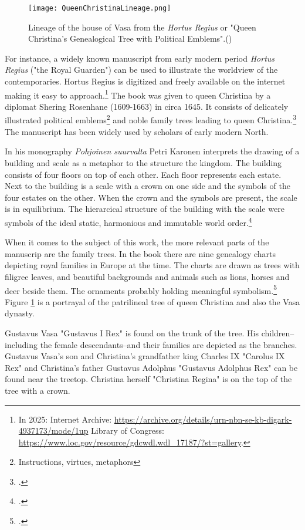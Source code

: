 \begin{figure}
	\texttt{[image: QueenChristinaLineage.png]}
	\caption{Lineage of the house of Vasa from the \textit{Hortus Regius} or "Queen Christina's Genealogical Tree with Political Emblems".(\cite{hortusregius})} 
	\centering
	\label{queenlineage}
\end{figure}

For instance, a widely known manuscript from early modern period \textit{Hortus Regius} ("the Royal Guarden") can be used to illustrate the worldview of the contemporaries. Hortus Regius is digitized and freely available on the internet making it easy to approach.\footnote{In 2025: Internet Archive: \url{https://archive.org/details/urn-nbn-se-kb-digark-4937173/mode/1up} Library of Congress: \url{https://www.loc.gov/resource/gdcwdl.wdl\_17187/?st=gallery}.} The book was given to queen Christina by a diplomat Shering Rosenhane (1609-1663) in circa 1645. It consists of delicately illustrated political emblems\footnote{Instructions, virtues, metaphors} and noble family trees leading to queen Christina.\footcites{congresslibrary}[p. 271.]{BlennowAnna} The manuscript has been widely used by scholars of early modern North.

In his monography \textit{Pohjoinen suurvalta} Petri Karonen interprets the drawing of a building and scale as a metaphor to the structure the kingdom. The building consists of four floors on top of each other. Each floor represents each estate. Next to the building is a scale with a crown on one side and the symbols of the four estates on the other. When the crown and the symbols are present, the scale is in equilibrium. The hierarcical structure of the building with the scale were symbols of the ideal static, harmonious and immutable world order.\footcite[p. 162-165.]{pSuurvalta}

When it comes to the subject of this work, the more relevant parts of the manuscrip are the family trees. In the book there are nine genealogy charts depicting royal families in Europe at the time. The charts are drawn as trees with filigree leaves, and beautiful backgrounds and animals such as lions, horses and deer beside them. The ornaments probably holding meaningful symbolism.\footcite{hortusregius} Figure \ref{queenlineage} is a portrayal of the patrilineal tree of queen Christina and also the Vasa dynasty.

Gustavus Vasa "Gustavus I Rex" is found on the trunk of the tree. His children–including the female descendants–and their families are depicted as the branches. Gustavus Vasa's son and Christina's grandfather king Charles IX "Carolus IX Rex" and Christina's father Gustavus Adolphus "Gustavus Adolphus Rex" can be found near the treetop. Christina herself "Christina Regina" is on the top of the tree with a crown. 

